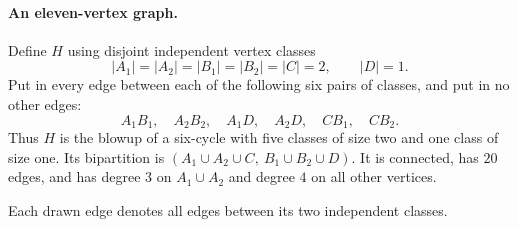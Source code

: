 \documentclass[11pt]{article}
\begin{document}
\paragraph{An eleven-vertex graph.}
Define \(H\) using disjoint independent vertex classes
\[
 |A_1|=|A_2|=|B_1|=|B_2|=|C|=2,\qquad |D|=1.
\]
Put in every edge between each of the following six pairs of classes,
and put in no other edges:
\[
 A_1B_1,\quad A_2B_2,\quad A_1D,\quad A_2D,\quad CB_1,\quad CB_2.
\]
Thus \(H\) is the blowup of a six-cycle with five classes of size two
and one class of size one. Its bipartition is
\((A_1\cup A_2\cup C,\ B_1\cup B_2\cup D)\).
It is connected, has \(20\) edges, and has degree \(3\) on \(A_1\cup A_2\)
and degree \(4\) on all other vertices.
\begin{center}

\small Each drawn edge denotes all edges between its two independent classes.
\end{center}
\end{document}
